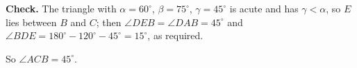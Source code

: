 \textbf{Check.} The triangle with $\alpha=60^\circ$, $\beta=75^\circ$, $\gamma=45^\circ$ is acute and has $\gamma<\alpha$, so $E$ lies between $B$ and $C$; then $\angle DEB=\angle DAB=45^\circ$ and $\angle BDE=180^\circ-120^\circ-45^\circ=15^\circ$, as required.

So $\angle ACB=\boxed{45^\circ}$.
